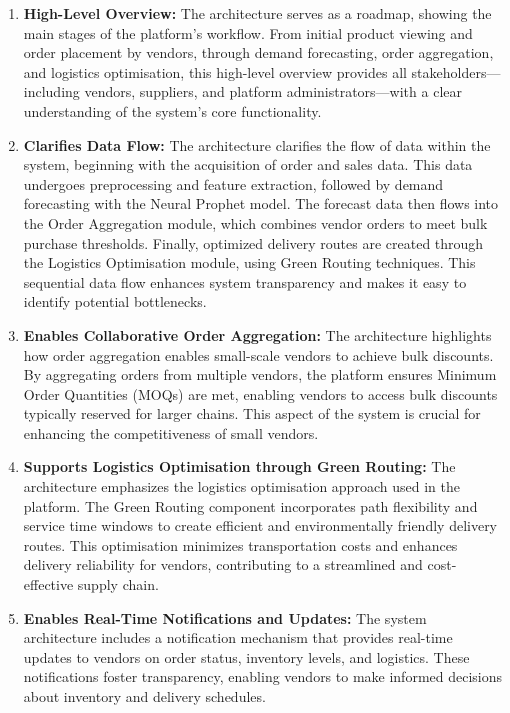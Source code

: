 \begin{enumerate}
    \item \textbf{High-Level Overview:} The architecture serves as a roadmap, showing the main stages of the platform’s workflow. From initial product viewing and order placement by vendors, through demand forecasting, order aggregation, and logistics optimisation, this high-level overview provides all stakeholders—including vendors, suppliers, and platform administrators—with a clear understanding of the system’s core functionality.

    \item \textbf{Clarifies Data Flow:} The architecture clarifies the flow of data within the system, beginning with the acquisition of order and sales data. This data undergoes preprocessing and feature extraction, followed by demand forecasting with the Neural Prophet model. The forecast data then flows into the Order Aggregation module, which combines vendor orders to meet bulk purchase thresholds. Finally, optimized delivery routes are created through the Logistics Optimisation module, using Green Routing techniques. This sequential data flow enhances system transparency and makes it easy to identify potential bottlenecks.

    \item \textbf{Enables Collaborative Order Aggregation:} The architecture highlights how order aggregation enables small-scale vendors to achieve bulk discounts. By aggregating orders from multiple vendors, the platform ensures Minimum Order Quantities (MOQs) are met, enabling vendors to access bulk discounts typically reserved for larger chains. This aspect of the system is crucial for enhancing the competitiveness of small vendors.

    \item \textbf{Supports Logistics Optimisation through Green Routing:} The architecture emphasizes the logistics optimisation approach used in the platform. The Green Routing component incorporates path flexibility and service time windows to create efficient and environmentally friendly delivery routes. This optimisation minimizes transportation costs and enhances delivery reliability for vendors, contributing to a streamlined and cost-effective supply chain.

    \item \textbf{Enables Real-Time Notifications and Updates:} The system architecture includes a notification mechanism that provides real-time updates to vendors on order status, inventory levels, and logistics. These notifications foster transparency, enabling vendors to make informed decisions about inventory and delivery schedules.


\end{enumerate}

